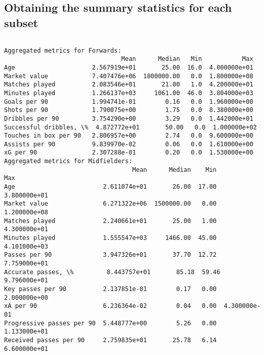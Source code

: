 \documentclass[11pt]{article}
\makeatletter
\newcommand{\boxspacing}{\kern\kvtcb@left@rule\kern\kvtcb@boxsep}
\newcommand{\prompt}[4]{
        {\ttfamily\llap{{\color{#2}[#3]:\hspace{3pt}#4}}\vspace{-\baselineskip}}
    }
\makeatother
\begin{document}
    \subsection{Obtaining the summary statistics for each
subset}\label{obtaining-the-summary-statistics-for-each-subset}

    \begin{tcolorbox}[breakable, size=fbox, boxrule=1pt, pad at break*=1mm,colback=cellbackground, colframe=cellborder]
\prompt{In}{incolor}{39}{\boxspacing}
\begin{Verbatim}[commandchars=\\\{\}]

\end{Verbatim}
\end{tcolorbox}

    \begin{Verbatim}[commandchars=\\\{\}]
Aggregated metrics for Forwards:
                                Mean      Median   Min           Max
Age                     2.567919e+01       25.00  16.0  4.000000e+01
Market value            7.407476e+06  1800000.00   0.0  1.800000e+08
Matches played          2.083546e+01       21.00   1.0  4.200000e+01
Minutes played          1.266137e+03     1061.00  46.0  3.804000e+03
Goals per 90            1.994741e-01        0.16   0.0  1.960000e+00
Shots per 90            1.790075e+00        1.75   0.0  8.380000e+00
Dribbles per 90         3.754290e+00        3.29   0.0  1.442000e+01
Successful dribbles, \%  4.872772e+01       50.00   0.0  1.000000e+02
Touches in box per 90   2.806957e+00        2.74   0.0  9.600000e+00
Assists per 90          9.839970e-02        0.06   0.0  1.610000e+00
xG per 90               2.307288e-01        0.20   0.0  1.530000e+00
Aggregated metrics for Midfielders:
                                   Mean      Median    Min           Max
Age                        2.611074e+01       26.00  17.00  3.800000e+01
Market value               6.271322e+06  1500000.00   0.00  1.200000e+08
Matches played             2.240661e+01       25.00   1.00  4.300000e+01
Minutes played             1.555547e+03     1466.00  45.00  4.101000e+03
Passes per 90              3.947326e+01       37.70  12.72  7.759000e+01
Accurate passes, \%         8.443757e+01       85.18  59.46  9.796000e+01
Key passes per 90          2.137851e-01        0.17   0.00  2.000000e+00
xA per 90                  6.236364e-02        0.04   0.00  4.300000e-01
Progressive passes per 90  5.448777e+00        5.26   0.00  1.133000e+01
Received passes per 90     2.759835e+01       25.78   6.14  6.600000e+01

\end{Verbatim}
\end{document}
